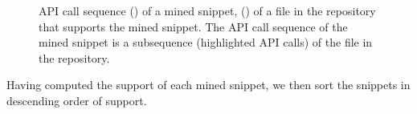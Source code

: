 \begin{figure}[h]
\ffigbox
{%
  \begin{subfloatrow}[2]
  \ffigbox[\FBwidth]
    {\caption{}\label{listings:support1}}{}
  \hspace{1em}%
  \ffigbox[\FBwidth]
    {\caption{}\label{listings:support2}}{}
  \end{subfloatrow}}
  {\caption[Support of the mined snippets]{API call sequence () of a mined snippet, () of a file in the repository that supports the mined snippet. The API call sequence of the mined snippet is a subsequence (highlighted API calls) of the file in the repository.}
\label{fig:support}}
\end{figure}
\vspace{-15pt}

Having computed the support of each mined snippet, we then sort the snippets in descending order of support.
